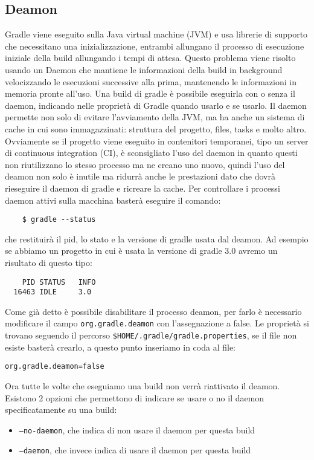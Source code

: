 \subsection{Deamon}
Gradle viene eseguito sulla Java virtual machine (JVM) e usa librerie di supporto che necessitano una inizializzazione, entrambi allungano il processo di esecuzione iniziale della build allungando i tempi di attesa. Questo problema viene risolto usando un Daemon che mantiene le informazioni della build in background velocizzando le esecuzioni successive alla prima, mantenendo le informazioni in memoria pronte all'uso. Una build di gradle è possibile eseguirla con o senza il daemon, indicando nelle proprietà di Gradle quando usarlo e se usarlo. Il daemon permette non solo di evitare l'avviamento della JVM, ma ha anche un sistema di cache in cui sono immagazzinati: struttura del progetto, files, tasks e molto altro. Ovviamente se il progetto viene eseguito in contenitori temporanei, tipo un server di continuous integration (CI), è sconsigliato l'uso del daemon in quanto questi non riutilizzano lo stesso processo ma ne creano uno nuovo, quindi l'uso del deamon non solo è inutile ma ridurrà anche le prestazioni dato che dovrà rieseguire il daemon di gradle e ricreare la cache. Per controllare i processi daemon attivi sulla macchina basterà eseguire il comando:
\begin{verbatim}
    $ gradle --status \end{verbatim}
che restituirà il pid, lo stato e la versione di gradle usata dal deamon. Ad esempio se abbiamo un progetto in cui è usata la versione di gradle 3.0 avremo un risultato di questo tipo:
\begin{verbatim}
    PID STATUS   INFO
  16463 IDLE     3.0 \end{verbatim}
Come già detto è possibile disabilitare il processo deamon, per farlo è necessario modificare il campo \texttt{org.gradle.deamon} con l'assegnazione a false. Le proprietà si trovano seguendo il percorso \texttt{\$HOME/.gradle/gradle.properties}, se il file non esiste basterà crearlo, a questo punto inseriamo in coda al file:
\begin{lstlisting}[frame=single]
    org.gradle.deamon=false
\end{lstlisting}
Ora tutte le volte che eseguiamo una build non verrà riattivato il deamon. Esistono 2 opzioni che permettono di indicare se usare o no il daemon specificatamente su una build:
\begin{itemize}
    \item \texttt{--no-daemon}, che indica di non usare il daemon per questa build
    \item \texttt{--daemon}, che invece indica di usare il daemon per questa build
\end{itemize}
